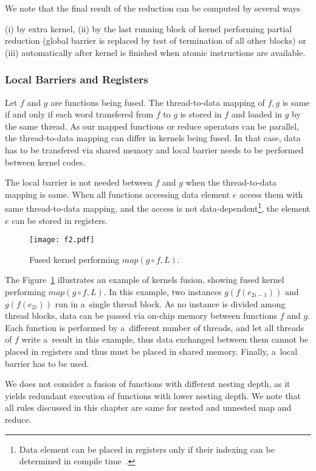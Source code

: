 \documentclass[final]{siamltex}
\begin{document}
We note that the final result of the reduction can be computed by several ways{ (i) by extra kernel, (ii) by the last running block of kernel performing partial reduction (global barrier is replaced by test of termination of all other blocks) or (iii) automatically after kernel is finished when atomic instructions are available.

\subsubsection{Local Barriers and Registers}

Let $f$ and $g$ are functions being fused. The thread-to-data mapping of $f, g$ is same if and only if each word transfered from $f$ to $g$ is stored in $f$ and loaded in $g$ by the same thread. As our mapped functions or reduce operators can be parallel, the thread-to-data mapping can differ in kernels being fused. In that case, data has to be transfered via shared memory and local barrier needs to be performed between kernel codes. 

The local barrier is not needed between $f$ and $g$ when the thread-to-data mapping is same. When all functions accessing data element $e$ access them with same thread-to-data mapping, and the access is not data-dependent\footnote{Data element can be placed in registers only if their indexing can be determined in compile time~\cite{nvidia2011nvidia}.}, the element $e$ can be stored in registers.

\begin{figure}[h]
\centering
\texttt{[image: f2.pdf]}
\caption{Fused kernel performing $map(g \circ f, L)$.}
\label{fig:map-ilustration}
\end{figure}

The Figure~\ref{fig:map-ilustration} illustrates an example of kernels fusion, showing fused kernel performing $map(g \circ f, L)$. In this example, two instances $g(f(e_{2i-1}))$ and $g(f(e_{2i}))$ run in a~single thread block. As no instance is divided among thread blocks, data can be passed via on-chip memory between functions $f$ and $g$. Each function is performed by a~different number of threads, and let all threads of $f$ write a~result in this example, thus data exchanged between them cannot be placed in registers and thus must be placed in shared memory. Finally, a~local barrier has to be used.

We does not consider a fusion of functions with different nesting depth, as it yields redundant execution of functions with lower nesting depth. We note that all rules discussed in this chapter are same for nested and unnested map and reduce.

}
\end{document}
